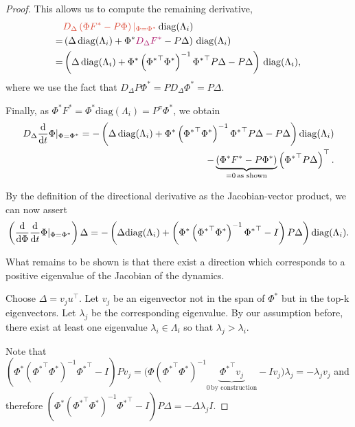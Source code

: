 \begin{proof}
This allows us to compute the remaining derivative,
\begin{align*}
    &{\color{uoftred}D_\Delta \left(\Phi F^* - P \Phi\right)|_{\Phi=\Phi^*}}\, \mathrm{diag}(\Lambda_i)\\
    = & \left(\Delta\, \mathrm{diag}(\Lambda_i) + \Phi^*{\color{uoftmagenta} D_\Delta F^*}  - P\Delta \right)\,\mathrm{diag}(\Lambda_i)\\
    = & \left(\Delta\, \mathrm{diag}(\Lambda_i) + \Phi^*\left({\Phi^*}^\top {\Phi^*}\right)^{-1}{\Phi^*}^\top P \Delta  - P\Delta \right)\,\mathrm{diag}(\Lambda_i),
\end{align*}
where we use the fact that $D_\Delta P\Phi^* = P D_\Delta \Phi^* = P \Delta$.

Finally, as $\Phi^*F^* = \Phi^* \mathrm{diag}(\Lambda_i) = P^\pi \Phi^*$, we obtain
\begin{align*}
 D_\Delta \frac{\mathrm{d}}{\mathrm{d} t} \Phi |_{\Phi=\Phi^*} =   -\left(\Delta\, \mathrm{diag}(\Lambda_i) + {\Phi^*}\left({\Phi^*}^\top \Phi^*\right)^{-1}{\Phi^*}^\top P \Delta  - P\Delta \right)\mathrm{diag}(\Lambda_i) \\- \underbrace{\left(\Phi^* F^* - P \Phi^*\right)}_{=0\,\text{as shown}}\left({\Phi^*}^\top P \Delta\right)^\top.
\end{align*}


By the definition of the directional derivative as the Jacobian-vector product, we can now assert
\begin{align*}
    \left(\frac{\mathrm{d}}{\mathrm{d} \Phi} \frac{\mathrm{d}}{\mathrm{d} t}\Phi |_{\Phi=\Phi^*}\right) \Delta = - \left(\Delta \mathrm{diag}(\Lambda_i) + \left(\Phi^*\left({\Phi^*}^\top {\Phi^*}\right)^{-1}{\Phi^*}^\top - I\right) P \Delta\right)\mathrm{diag}(\Lambda_i).
\end{align*}

What remains to be shown is that there exist a direction which corresponds to a positive eigenvalue of the Jacobian of the dynamics.

Choose $\Delta = v_j u^\top$. Let $v_j$ be an eigenvector not in the span of $\Phi^*$ but in the top-k eigenvectors. Let  $\lambda_j$ be the corresponding eigenvalue. By our assumption before, there exist at least one eigenvalue $\lambda_i \in \Lambda_i$ so that $\lambda_j > \lambda_i$.

Note that $\left(\Phi^*\left({\Phi^*}^\top {\Phi^*}\right)^{-1}{\Phi^*}^\top - I\right) P v_j = \Big(\Phi\left({\Phi^*}^\top {\Phi^*}\right)^{-1}\underbrace{{\Phi^*}^\top v_j}_{0\, \text{by construction}} - I v_j\Big) \lambda_j = -\lambda_j v_j$ and therefore $\left(\Phi^*\left({\Phi^*}^\top \Phi^*\right)^{-1}{\Phi^*}^\top - I\right) P \Delta = -\Delta \lambda_j I.$


\end{proof}
